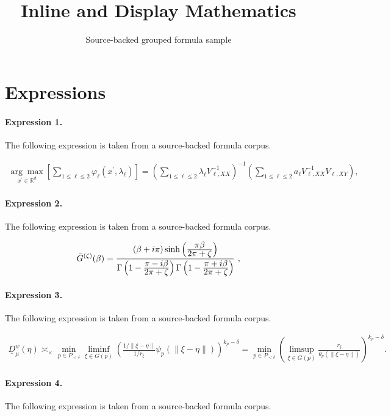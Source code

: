 \documentclass[11pt]{article}
\title{Inline and Display Mathematics}
\author{Source-backed grouped formula sample}
\date{}
\begin{document}
\maketitle
\section{Expressions}
\paragraph{Expression 1.} The following expression is taken from a source-backed formula corpus.

\begin{align*}\underset{x^\prime \in \mathbb{R}^d}{\arg \max } \left[ \sum_{1\leq \ell \leq 2} \varphi_\ell(x^{\prime}, \lambda_\ell)\right] = \left(\sum_{1 \leq \ell \leq 2} \lambda_{\ell} V_{\ell, X X}^{-1}\right)^{-1} \left(\sum_{1 \leq \ell \leq 2} a_{\ell} V_{\ell, X X}^{-1} V_{\ell, X Y}\right),\end{align*}

\paragraph{Expression 2.} The following expression is taken from a source-backed formula corpus.

\begin{align*}{\bar G}^{(\zeta )}(\beta )={(\beta +i\pi )\sinh\left( {\displaystyle \pi\beta\over \displaystyle 2\pi +\zeta}\right) \over\Gamma \left( 1- {\displaystyle\pi-i\beta \over \displaystyle 2\pi+\zeta}\right)\Gamma \left( 1- {\displaystyle\pi+i\beta \over \displaystyle 2\pi+\zeta}\right)}\ ,\end{align*}

\paragraph{Expression 3.} The following expression is taken from a source-backed formula corpus.

\begin{align*}\underline D_\mu^\psi(\eta)\asymp_\times \min_{p\in P_{<\delta}} \liminf_{\xi\in G(p)} \left(\frac{1/\|\xi - \eta\|}{1/r_\xi} \psi_p(\|\xi - \eta\|) \right)^{k_p - \delta}= \min_{p\in P_{<\delta}} \left(\limsup_{\xi\in G(p)} \frac{r_\xi}{\theta_p(\|\xi - \eta\|)} \right)^{k_p - \delta}.\end{align*}

\paragraph{Expression 4.} The following expression is taken from a source-backed formula corpus.
\end{document}

